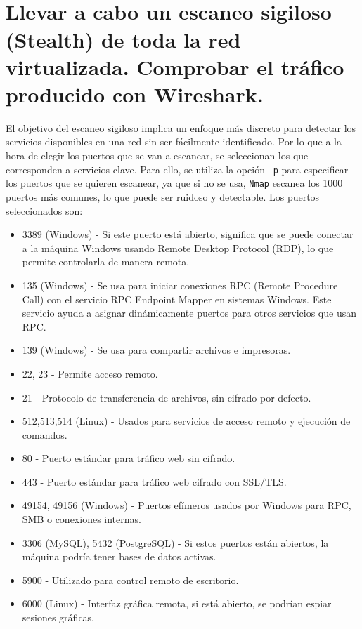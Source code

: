\documentclass[a4paper,12pt]{article} %
\begin{document}
\\ \\
\section{Llevar a cabo un escaneo sigiloso (Stealth) de toda la red virtualizada. Comprobar el tráfico producido con Wireshark.}

El objetivo del escaneo sigiloso  implica un enfoque más discreto para detectar los servicios disponibles en una red sin ser fácilmente identificado. Por lo que a la hora de elegir los puertos que se van a escanear, se seleccionan los que corresponden a servicios clave. Para ello, se utiliza la opción \texttt{-p} para especificar los puertos que se quieren escanear, ya que si no se usa, \texttt{Nmap} escanea los 1000 puertos más comunes, lo que puede ser ruidoso y detectable. Los puertos seleccionados son:
\begin{itemize}
    \item 3389 (Windows) - Si este puerto está abierto, significa que se puede conectar a la máquina Windows usando Remote Desktop Protocol (RDP), lo que permite controlarla de manera remota. 
    \item 135 (Windows) - Se usa para iniciar conexiones RPC (Remote Procedure Call) con el servicio RPC Endpoint Mapper en sistemas Windows. Este servicio ayuda a asignar dinámicamente puertos para otros servicios que usan RPC.
    \item 139 (Windows) - Se usa para compartir archivos e impresoras.
    \item 22, 23 - Permite acceso remoto. 
    \item 21 -  Protocolo de transferencia de archivos, sin cifrado por defecto.
    \item 512,513,514 (Linux) - Usados para servicios de acceso remoto y ejecución de comandos.
    \item 80 - Puerto estándar para tráfico web sin cifrado.
    \item 443 - Puerto estándar para tráfico web cifrado con SSL/TLS.
    \item 49154, 49156 (Windows) - Puertos efímeros usados por Windows para RPC, SMB o conexiones internas.
    \item 3306 (MySQL), 5432 (PostgreSQL) -  Si estos puertos están abiertos, la máquina podría tener bases de datos activas.
    \item 5900 - Utilizado para control remoto de escritorio.
    \item 6000 (Linux) - Interfaz gráfica remota, si está abierto, se podrían espiar sesiones gráficas. 

\end{itemize}
\end{document}
